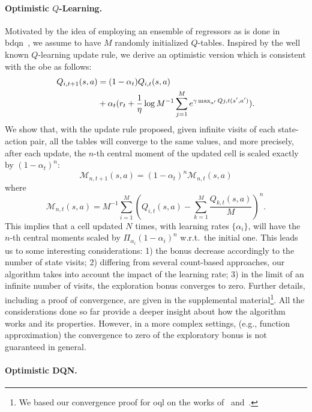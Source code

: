 \paragraph{Optimistic $Q$-Learning.}
Motivated by the idea of employing an ensemble of regressors as is done in \gls{bdqn}~\cite{osband2017deep}, we assume to have $M$ randomly initialized $Q$-tables. Inspired by the well known $Q$-learning update rule, we derive an optimistic version which is consistent with the \gls{obe} as follows:
\begin{align*}
      \small  Q_{i, t+1}(s,a) &= (1-\alpha_t)Q_{i,t}(s,a)  \nonumber  \\
  & \small + \alpha_t (r_t + \frac{1}{\eta} \log M^{-1} \sum_{j=1}^M e^{\gamma \max_{a'} Q{j,t}(s', a')}).\nonumber
\end{align*}
\label{def:optimistic_qlearning}
We show that, with the update rule proposed, given infinite visits of each state-action pair, all the tables will converge to the same values, and more precisely, after each update, the $n$-th central moment of the updated cell is scaled exactly by $(1 - \alpha_t)^n$:
\begin{equation}
	\mathcal{M}_{n,t+1}(s,a) = (1-\alpha_t)^n \mathcal{M}_{n,t}(s,a) \label{momentdecreasing}
\end{equation}
where 
\begin{equation}
	\mathcal{M}_{n,t}(s,a) = M^{-1} \sum_{i=1}^M (Q_{i,t}(s,a) - \sum_{k=1}^M \frac{Q_{k,t}(s,a)}{M})^n. \nonumber
\end{equation}
This implies that a cell updated $N$ times, with learning rates $\{\alpha_i\}$, will have the $n$-th central moments scaled by $\Pi_{\alpha_i}(1-\alpha_i)^n$ w.r.t.\ the initial one. This leads us to some interesting considerations: 1) the bonus decrease accordingly to the number of state visits; 2) differing from several count-based approaches, our algorithm takes into account the impact of the learning rate; 3) in the limit of an infinite number of visits, the exploration bonus converges to zero.
Further details, including a proof of convergence, are given in the supplemental material\footnote{We based our convergence proof for \gls{oql} on the works of~\cite{melo2001convergence} and~\cite{jaakkola1994convergence}.}.
All the considerations done so far provide a deeper insight about how the algorithm works and its properties. However, in a more complex settings, (e.g., function approximation) the convergence to zero of the exploratory bonus is not guaranteed in general.

\paragraph{Optimistic DQN.}
\label{sec:proposedalg}

